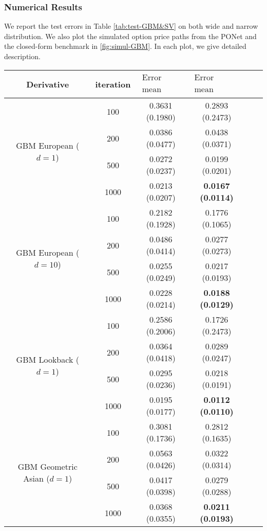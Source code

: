 \documentclass[11pt,a4paper]{article}
\theoremstyle{remark}
\begin{document}
  \subsubsection{Numerical Results}
  We report the test errors in Table \ref{tab:test-GBM&SV} on both wide and narrow distribution. We also plot the simulated option price paths from the PONet and the closed-form benchmark in \ref{fig:simul-GBM}. In each plot, we give detailed description.
  
  \iffalse
\begin{table}[htbp!]
	\centering
	\begin{tabular}{cccccc}
		\hline Derivative & iteration & $\begin{array}{c}\text{Error (wide)} \\
			\text{mean (stdev)} \end{array}$   & $\begin{array}{c}\text{Error (narrow)} \\
			\text{mean (stdev)} \end{array}$  \\
		\hline \multirow{4}{*}{GBM European ($d=1$)} & 100 & 0.3631 (0.1980) & 0.2893 (0.2473) \\
		& 200 & 0.0386  (0.0477) & 0.0438 (0.0371) \\
		& 500 & 0.0272 (0.0237) & 0.0199 (0.0201) \\
		& 1000 & 0.0213 (0.0207) & \textbf{0.0167  (0.0114)} \\
		
		\hline \multirow{4}{*}{GBM European ($d=10$)} & 100 & 0.2182 (0.1928) & 0.1776 (0.1065) \\
		& 200 & 0.0486 (0.0414) & 0.0277 (0.0273) \\
		& 500 & 0.0255 (0.0249) & 0.0217 (0.0193) \\
		& 1000 & 0.0228 (0.0214) & \textbf{0.0188 (0.0129)} \\
		
		\hline \multirow{4}{*}{GBM Lookback ($d=1$)} & 100 & 0.2586 (0.2006) & 0.1726 (0.2473) \\
		& 200 & 0.0364 (0.0418) & 0.0289 (0.0247) \\
		& 500 & 0.0295 (0.0236)  & 0.0218 (0.0191) \\
		& 1000 & 0.0195 (0.0177) & \textbf{0.0112 (0.0110)} \\
		
		\hline \multirow{4}{*}{GBM Geometric Asian ($d=1$)} & 100 & 0.3081 (0.1736) & 0.2812 (0.1635) \\
		& 200 & 0.0563 (0.0426) & 0.0322 (0.0314) \\
		& 500 & 0.0417 (0.0398) & 0.0279 (0.0288) \\
		& 1000 & 0.0368 (0.0355) & \textbf{0.0211 (0.0193)} \\
		

\end{tabular}
\end{table}
\end{document}
